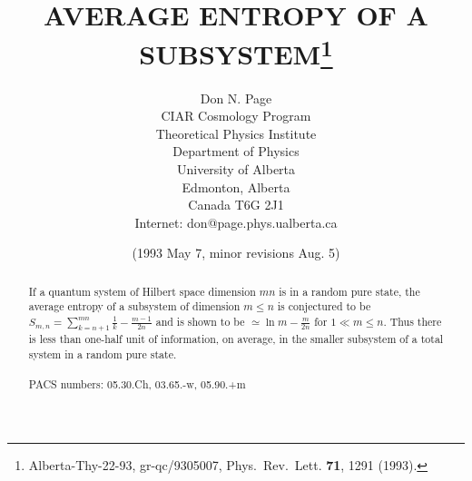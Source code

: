 
\textwidth 15cm
\textheight 22cm
\topmargin -10mm

\title{AVERAGE ENTROPY OF A SUBSYSTEM\thanks
{Alberta-Thy-22-93, gr-qc/9305007, Phys.\ Rev.\ Lett. {\bf 71}, 1291
(1993).}}
\author{ Don N. Page\\
CIAR Cosmology Program\\
Theoretical Physics Institute\\
Department of Physics\\University of Alberta\\
Edmonton, Alberta\\Canada T6G 2J1\\
Internet:  don@page.phys.ualberta.ca}
\date{(1993 May 7, minor revisions Aug. 5)}
\maketitle
\large
\begin{abstract}
\baselineskip 25pt
If a quantum system of Hilbert space dimension $mn$ is in a random
pure state,
the average entropy of a subsystem of dimension $m\leq n$ is
conjectured to be
$S_{m,n}=\sum_{k=n+1}^{mn}\frac{1}{k} - \frac{m-1}{2n}$ and is shown
to be
$\simeq \ln m - \frac{m}{2n}$ for $1\ll m\leq n$.  Thus there is less
than
one-half unit of information, on average, in the smaller subsystem of
a total
system in a random pure state.
\\
\\
PACS numbers: 05.30.Ch, 03.65.-w, 05.90.+m
\end{abstract}
\normalsize
\pagebreak
\baselineskip 24.2pt


